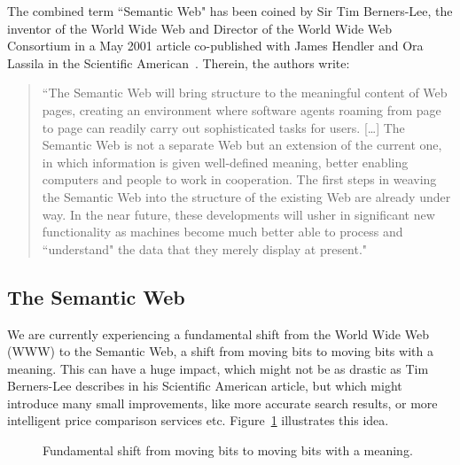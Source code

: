 \documentclass[12pt]{article}
\begin{document}
The combined term ``Semantic Web" has been coined by Sir Tim Berners-Lee, the inventor of the World Wide Web and Director of the World Wide Web Consortium in a May 2001 article co-published with James Hendler and Ora Lassila in the Scientific American~\cite{berners-lee_et_al_2001}. Therein, the authors write: 
\begin{quote}
``The Semantic Web will bring structure to the meaningful content of Web pages, creating an environment where software agents roaming from page to page can readily carry out sophisticated tasks for users. [\ldots]
The Semantic Web is not a separate Web but an extension of the current one, in which information is given well-defined meaning, better enabling computers and people to work in cooperation. The first steps in weaving the Semantic Web into the structure of the existing Web are already under way. In the near future, these developments will usher in significant new functionality as machines become much better able to process and ``understand" the data that they merely display at present."
\end{quote}

\subsection{The Semantic Web}
We are currently experiencing a fundamental shift from the World Wide Web (WWW) to the Semantic Web, a shift from moving bits to moving bits with a meaning. This can have a huge impact, which might not be as drastic as Tim Berners-Lee describes in his Scientific American article, but which might introduce many small improvements, like more accurate search results, or more intelligent price comparison services etc. Figure~\ref{fig:fundamental-shift} illustrates this idea.

\begin{figure}[htbp!]
\begin{center}
  \caption{Fundamental shift from moving bits to moving bits with a meaning.}
  \label{fig:fundamental-shift}  
\end{center}    
\end{figure}
\end{document}
